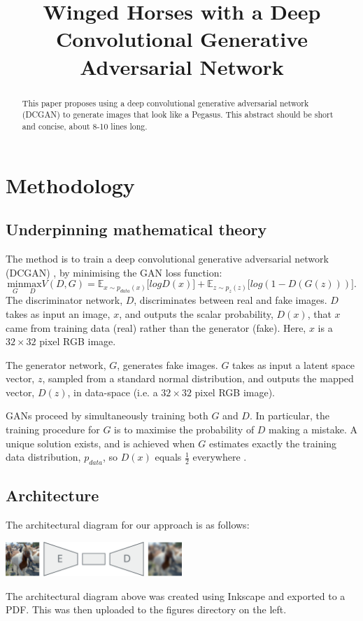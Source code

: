 \documentclass{article}
\title{Winged Horses with a Deep Convolutional Generative Adversarial Network}
\begin{document}
\maketitle
\begin{abstract}
    This paper proposes using a deep convolutional generative adversarial network (DCGAN) to generate images that look like a Pegasus. This abstract should be short and concise, about 8-10 lines long.
\end{abstract}

\section{Methodology}
\subsection{Underpinning mathematical theory}
The method is to train a deep convolutional generative adversarial network (DCGAN) \cite{article}, by minimising the GAN loss function: 
\begin{equation}
    \underset{G}{\text{min}} \underset{D}{\text{max}}V(D,G) = \mathbb{E}_{x\sim p_{data}(x)}\big[logD(x)\big] + \mathbb{E}_{z\sim p_{z}(z)}\big[log(1-D(G(z)))\big].
\end{equation}
The discriminator network, $D$, discriminates between real and fake images. $D$ takes as input an image, $x$, and outputs the scalar probability, $D(x)$, that $x$ came from training data (real) rather than the generator (fake). Here, $x$ is a $32 \times 32$ pixel RGB image.  

The generator network, $G$, generates fake images. $G$ takes as input a latent space vector, $z$, sampled from a standard normal distribution, and outputs the mapped vector, $D(z)$, in data-space (i.e. a $32 \times 32$ pixel RGB image). 

GANs proceed by simultaneously training both $G$ and $D$. In particular, the training procedure for $G$ is to maximise the probability of $D$ making a mistake. A unique solution exists, and is achieved when $G$ estimates exactly the training data distribution, $p_{data}$, so $D(x)$ equals $\frac{1}{2}$ everywhere \cite{NIPS2014_5ca3e9b1}.

\subsection{Architecture}
The architectural diagram for our approach is as follows:
\begin{center}
    \includegraphics[width=0.5\textwidth]{figures/architecture.pdf}
\end{center}
The architectural diagram above was created using Inkscape and exported to a PDF. This was then uploaded to the figures directory on the left.
\end{document}
